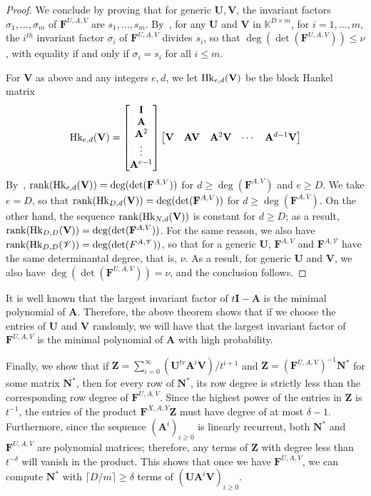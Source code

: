 \documentclass[12pt]{article}
\def\K {\ensuremath{\mathbb{K}}}
\def\scrV {\ensuremath{\mathscr{V}}}
\def\K{\mathbb{K}}
\def\mA{\mathbf{A}}
\def\mF{\mathbf{F}}
\def\mI{\mathbf{I}}
\def\mN{\mathbf{N}}
\def\mU{\mathbf{U}}
\def\mV{\mathbf{V}}
\def\mZ{\mathbf{Z}}
\begin{document}
\begin{proof}
	We conclude by proving that for generic $\mU,\mV$, the invariant factors
	$\sigma_1,\dots,\sigma_m$ of $\mF^{U,A,V}$ are $s_1,\dots,s_m$.
	By~\cite[Theorem~2.12]{KaVi04}, for any $\mU$ and $\mV$ in $\K^{D\times
		m}$, for $i=1,\dots,m$, the $i^{th}$ invariant factor $\sigma_i$ of
	$\mF^{U,A,V}$ divides $s_i$, so that $\deg(\det(\mF^{U,A,V}))\le\nu$, with
	equality if and only if $\sigma_i=s_i$ for all $i \le m$.
	
	For $\mV$ as above and any integers $e,d$, we let ${\rm Hk}_{e,d}(\mV)$ be
	the block Hankel matrix
	$$ {\rm Hk}_{e,d}(\mV) =
	\begin{bmatrix}
	\mI \\  \mA \\  \mA^2 \\ \vdots  \\  \mA^{e-1}
	\end{bmatrix}
	\begin{bmatrix}
	\mV & \mA\mV & \mA^2\mV &\cdots&  \mA^{d-1}\mV
	\end{bmatrix}
	$$ By~\cite[Eq.~(2.6)]{KaVi04}, ${\rm rank}({\rm Hk}_{e,d}(\mV)) =
	\deg(\det(\mF^{A,V}))$ for $d \ge \deg(\mF^{A,V})$ and $e \ge D$.  We take
	$e=D$, so that ${\rm rank}({\rm Hk}_{D,d}(\mV)) = \deg(\det(\mF^{A,V}))$
	for $d \ge \deg(\mF^{A,V})$. On the other hand, the sequence ${\rm
		rank}({\rm Hk}_{N,d}(\mV))$ is constant for $d \ge D$; as a result,
	${\rm rank}({\rm Hk}_{D,D}(\mV)) = \deg(\det(\mF^{A,V}))$. For the same
	reason, we also have ${\rm rank}({\rm Hk}_{D,D}(\scrV)) =
	\deg(\det(F^{A,\scrV}))$, so that for a generic $\mU$, $\mF^{A,V}$ and
	$\mF^{A,\scrV}$ have the same determinantal degree, that is, $\nu$.  As
	a result, for generic $\mU$ and $\mV$, we also have
	$\deg(\det(\mF^{U,A,V}))=\nu$, and the conclusion follows.
\end{proof} 

It is well known that the largest invariant factor of
$t\mI - \mA$ is the minimal polynomial of $\mA$. Therefore, the above
theorem shows that if we choose the entries of $\mU$ and $\mV$
randomly, we will have that the
largest invariant factor of $\mF^{U,A,V}$ is the minimal
polynomial of $\mA$  with high probability.

Finally, we show that if $\mZ = 
\sum_{i=0}^{\infty} (\mU^{tr} \mA^i \mV)/ t^{i+1}$ and
$\mZ = (\mF^{U,A,V})^{-1}\mN^*$ for some matrix $\mN^*$,
then for every row of $\mN^*$, 
its row degree is strictly
less than the corresponding row degree of $\mF^{U,A,V}$.
Since the highest power of the entries in $\mZ$ is $t^{-1}$, the 
entries of the product $\mF^{X,A,Y}\mZ$ must have degree of at 
most $\delta -1$. Furthermore, since the sequence $(\mA^i)_{i \ge 
	0}$ is linearly recurrent, both $\mN^*$ and $\mF^{U,A,V}$ are 
polynomial matrices;
therefore, any terms of $\mZ$ with degree less than $t^{-\delta}$
will vanish in the product.
This shows that once we have $\mF^{U,A,V}$, we can compute
$\mN^*$ with $\lceil D / m \rceil \ge \delta$ terms of $(\mU\mA^i\mV)_{i \ge 0}$.
\end{document}
